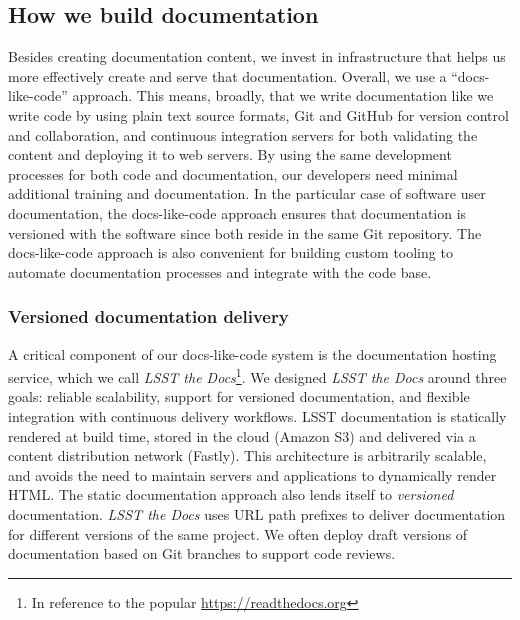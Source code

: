 \subsection{How we build documentation}
\label{sec:doc_builds}

Besides creating documentation content, we invest in infrastructure that helps us more effectively create and serve that documentation.
Overall, we use a ``docs-like-code'' approach.\cite{Gentle:2017}
This means, broadly, that we write documentation like we write code by using plain text source formats, Git and GitHub for version control and collaboration, and continuous integration servers for both validating the content and deploying it to web servers.
By using the same development processes for both code and documentation, our developers need minimal additional training and documentation.
In the particular case of software user documentation, the docs-like-code approach ensures that documentation is versioned with the software since both reside in the same Git repository.
The docs-like-code approach is also convenient for building custom tooling to automate documentation processes and integrate with the code base.

\subsubsection{Versioned documentation delivery}
\label{sec:ltd}

A critical component of our docs-like-code system is the documentation hosting service, which we call \textit{LSST the Docs}\cite{SQR-006}\footnote{In reference to the popular \url{https://readthedocs.org}}.
We designed \textit{LSST the Docs} around three goals: reliable scalability, support for versioned documentation, and flexible integration with continuous delivery workflows.
LSST documentation is statically rendered at build time, stored in the cloud (Amazon S3) and delivered via a content distribution network (Fastly).
This architecture is arbitrarily scalable, and avoids the need to maintain servers and applications to dynamically render HTML.
The static documentation approach also lends itself to \emph{versioned} documentation.
\textit{LSST the Docs} uses URL path prefixes to deliver documentation for different versions of the same project.
We often deploy draft versions of documentation based on Git branches to support code reviews.

